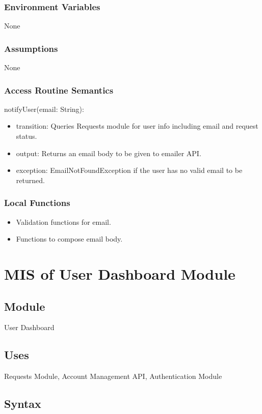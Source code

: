 \documentclass[12pt, titlepage]{article}
\begin{document}
\subsubsection{Environment Variables}
None

\subsubsection{Assumptions}
None

\subsubsection{Access Routine Semantics}

\noindent notifyUser(email: String):
\begin{itemize}
  \item transition: Queries Requests module for user info including email and request status.
  \item output: Returns an email body to be given to emailer API.
  \item exception: EmailNotFoundException if the user has no valid email to be returned.
\end{itemize}

\subsubsection{Local Functions}
\begin{itemize}
  \item Validation functions for email.
  \item Functions to compose email body.
\end{itemize}

\section{MIS of User Dashboard Module} \label{UserDashboard} \subsection{Module} User Dashboard

\subsection{Uses}
Requests Module, Account Management API, Authentication Module

\subsection{Syntax}
\end{document}
